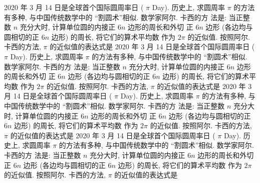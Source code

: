 \documentclass{ctexart}
\begin{document}

\newpage

2020 年 3 月 14 日是全球首个国际圆周率日 ( $\pi$ Day). 历史上, 求圆周率 $\pi$ 的方法有多种, 与中国传统数学中的 “割圆术”相似. 数学家阿尔. 卡西的方 法是: 当正整数 $n$ 充分大时, 计算单位圆的内接正 $6 n$ 边形的周长和外切 正 $6 n$ 边形 (各边均与圆相切的正 $6 n$ 边形) 的周长, 将它们的算术平均数 作为 $2 \pi$ 的近似值. 按照阿尔. 卡西的方法, $\pi$ 的近似值的表达式是 \paren
{}
2020 年 3 月 14 日是全球首个国际圆周率日 ( $\pi$ Day). 历史上, 求圆周率 $\pi$ 的方法有多种, 与中国传统数学中的 “割圆术”相似. 数学家阿尔. 卡西的方 法是: 当正整数 $n$ 充分大时, 计算单位圆的内接正 $6 n$ 边形的周长和外切 正 $6 n$ 边形 (各边均与圆相切的正 $6 n$ 边形) 的周长, 将它们的算术平均数 作为 $2 \pi$ 的近似值. 按照阿尔. 卡西的方法, $\pi$ 的近似值的表达式是 \paren
{}
2020 年 3 月 14 日是全球首个国际圆周率日 ( $\pi$ Day). 历史上, 求圆周率 $\pi$ 的方法有多种, 与中国传统数学中的 “割圆术”相似. 数学家阿尔. 卡西的方 法是: 当正整数 $n$ 充分大时, 计算单位圆的内接正 $6 n$ 边形的周长和外切 正 $6 n$ 边形 (各边均与圆相切的正 $6 n$ 边形) 的周长, 将它们的算术平均数 作为 $2 \pi$ 的近似值. 按照阿尔. 卡西的方法, $\pi$ 的近似值的表达式是 \paren
{}
2020 年 3 月 14 日是全球首个国际圆周率日 ( $\pi$ Day). 历史上, 求圆周率 $\pi$ 的方法有多种, 与中国传统数学中的 “割圆术”相似. 数学家阿尔. 卡西的方 法是: 当正整数 $n$ 充分大时, 计算单位圆的内接正 $6 n$ 边形的周长和外切 正 $6 n$ 边形 (各边均与圆相切的正 $6 n$ 边形) 的周长, 将它们的算术平均数 作为 $2 \pi$ 的近似值. 按照阿尔. 卡西的方法, $\pi$ 的近似值的表达式是 \paren
{}
\end{document}
